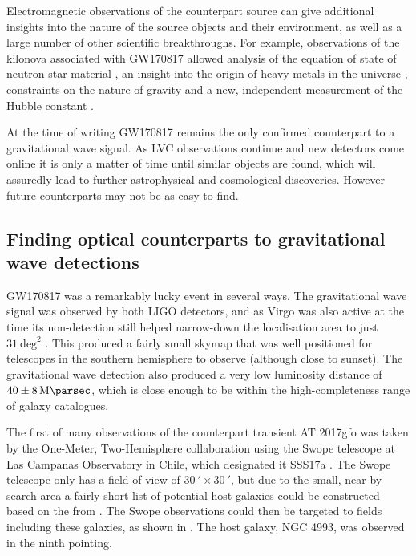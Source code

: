 \begin{colsection}
\begin{colsection}
\newpage

Electromagnetic observations of the counterpart source can give additional insights into the nature of the source objects and their environment, as well as a large number of other scientific breakthroughs. For example, observations of the kilonova associated with GW170817 \citep{GW170817, GW170817_followup} allowed analysis of the equation of state of neutron star material \citep{GW170817_NSscience}, an insight into the origin of heavy metals in the universe \citep{GW170818_heavy}, constraints on the nature of gravity \citep{GW170817_gravity} and a new, independent measurement of the Hubble constant \citep{GW170817_hubble}.

At the time of writing GW170817 remains the only confirmed counterpart to a gravitational wave signal. As LVC observations continue and new detectors come online it is only a matter of time until similar objects are found, which will assuredly lead to further astrophysical and cosmological discoveries. However future counterparts may not be as easy to find.

\end{colsection}


\subsection{Finding optical counterparts to gravitational wave detections}
\label{sec:followup}
\begin{colsection}

GW170817 was a remarkably lucky event in several ways. The gravitational wave signal was observed by both LIGO detectors, and as Virgo was also active at the time its non-detection still helped narrow-down the localisation area to just $31~\text{deg}^2$ \citep[see ]{GW170817}. This produced a fairly small skymap that was well positioned for telescopes in the southern hemisphere to observe (although close to sunset). The gravitational wave detection also produced a very low luminosity distance of $40\pm\SI{8}{\mega\parsec}$, which is close enough to be within the high-completeness range of galaxy catalogues.

The first of many observations of the counterpart transient AT 2017gfo was taken by the One-Meter, Two-Hemisphere collaboration using the Swope telescope at Las Campanas Observatory in Chile, which designated it SSS17a \citep{GW170817_Swope}. The Swope telescope only has a field of view of $\SI{30}{\arcmin}\times\SI{30}{\arcmin}$, but due to the small, near-by search area a fairly short list of potential host galaxies could be constructed based on the  from \citet{GWGC}. The Swope observations could then be targeted to fields including these galaxies, as shown in . The host galaxy, NGC 4993, was observed in the ninth pointing.


\end{colsection}
\end{colsection}
